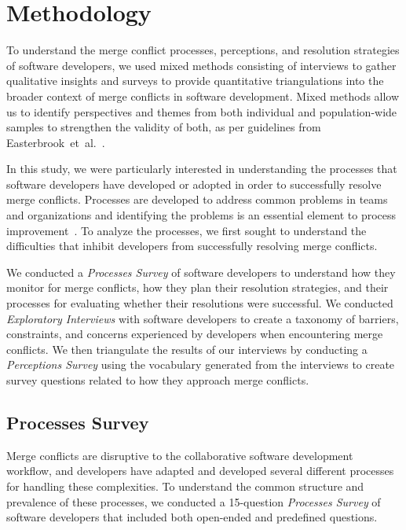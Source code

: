 
\section{Methodology}\label{methodology}


To understand the merge conflict processes, perceptions, and resolution strategies of software developers, we used mixed methods consisting of interviews to gather qualitative insights and surveys to provide quantitative triangulations into the broader context of merge conflicts in software development.
Mixed methods allow us to identify perspectives and themes from both individual and population-wide samples to strengthen the validity of both, as per guidelines from \mbox{Easterbrook et al.}~\cite{easterbrook2008selecting}.

In this study, we were particularly interested in understanding the processes that software developers have developed or adopted in order to successfully resolve merge conflicts.
Processes are developed to address common problems in teams and organizations and identifying the problems is an essential element to process improvement~\cite{beecham2003software}.
To analyze the processes, we first sought to understand the difficulties that inhibit developers from successfully resolving merge conflicts.

We conducted a \textit{Processes Survey} of software developers to understand how they monitor for merge conflicts, how they plan their resolution strategies, and their processes for evaluating whether their resolutions were successful.
We conducted \textit{Exploratory Interviews} with software developers to create a taxonomy of barriers, constraints, and concerns experienced by developers when encountering merge conflicts.
We then triangulate the results of our interviews by conducting a \textit{Perceptions Survey} using the vocabulary generated from the interviews to create survey questions related to how they approach merge conflicts.

\subsection{Processes Survey}\label{processes_survey}

Merge conflicts are disruptive to the collaborative software development workflow, and developers have adapted and developed several different processes for handling these complexities.
To understand the common structure and prevalence of these processes, we conducted a 15-question \textit{Processes Survey} of software developers that included both open-ended and predefined questions.

